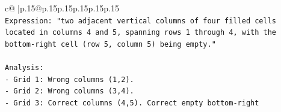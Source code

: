 \documentclass{article}
\begin{document}
{\begin{supertabular}{c@{$\;$}|p{.15\linewidth}@{}p{.15\linewidth}p{.15\linewidth}p{.15\linewidth}p{.15\linewidth}p{.15\linewidth}}
{{{\\ 
\texttt{Expression: "two adjacent vertical columns of four filled cells located in columns 4 and 5, spanning rows 1 through 4, with the bottom{-}right cell (row 5, column 5) being empty."} \\
\\ 
\texttt{Analysis:} \\
\texttt{{-} Grid 1: Wrong columns (1,2).} \\
\texttt{{-} Grid 2: Wrong columns (3,4).} \\
\texttt{{-} Grid 3: Correct columns (4,5). Correct empty bottom{-}right} \\
            }
        }
    }
     \\ \\

\end{supertabular}
}
\end{document}
